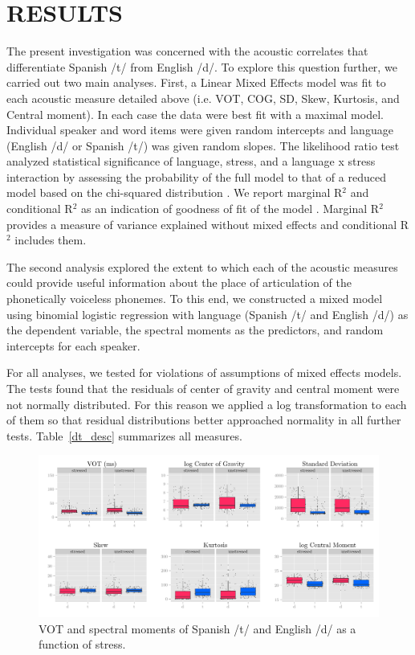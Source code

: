 \documentclass[a4paper,10pt,twocolumn]{article}\usepackage[]{graphicx}\usepackage[]{color}
\begin{document}

\section{RESULTS} %
\label{sec:results}

	The present investigation was concerned with the acoustic correlates that differentiate Spanish /t/ from English /d/. To explore this question further, we carried out two main analyses. First, a Linear Mixed Effects model was fit to each acoustic measure detailed above (i.e. VOT, COG, SD, Skew, Kurtosis, and Central moment). In each case the data were best fit with a maximal model. Individual speaker and word items were given random intercepts and language (English /d/ or Spanish /t/) was given random slopes. The likelihood ratio test analyzed statistical significance of language, stress, and a language x stress interaction by assessing the probability of the full model to that of a reduced model based on the chi-squared distribution \cite{winter_2013lr}. We report marginal R$^2$ and conditional R$^2$ as an indication of goodness of fit of the model \cite{Nakagawa2013}. Marginal R$^2$ provides a measure of variance explained without mixed effects and conditional R$^2$ includes them.

	The second analysis explored the extent to which each of the acoustic measures could provide useful information about the place of articulation of the phonetically voiceless phonemes. To this end, we constructed a mixed model using binomial logistic regression with language (Spanish /t/ and English /d/) as the dependent variable, the spectral moments as the predictors, and random intercepts for each speaker. 

	For all analyses, we tested for violations of assumptions of mixed effects models. The tests found that the residuals of center of gravity and central moment were not normally distributed. For this reason we applied a log transformation to each of them so that residual distributions better approached normality in all further tests. Table~\ref{dt_desc} summarizes all measures. 

	 

	\begin{figure}[t]
	{\scriptsize{\caption{VOT and spectral moments of Spanish /t/ and English /d/ as a function of stress.\label{fig:all}}}}
	\centering
	\includegraphics[width=\textwidth]{../figures/dt_all.pdf}
	\end{figure}
\end{document}
